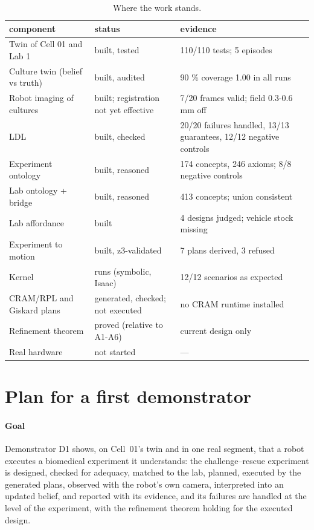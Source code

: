 \documentclass[10.5pt,a4paper]{article}
\begin{document}
\begin{table}[htbp]\centering\footnotesize\caption{Where the work stands.}
\begin{tabularx}{\linewidth}{@{}p{4.6cm}p{4.2cm}X@{}}\toprule component & status & evidence \\\midrule
Twin of Cell 01 and Lab 1 & built, tested & 110/110 tests; 5 episodes \\
Culture twin (belief vs truth) & built, audited & 90 \% coverage 1.00 in all runs \\
Robot imaging of cultures & built; registration not yet effective & 7/20 frames valid; field 0.3-0.6 mm off \\
LDL & built, checked & 20/20 failures handled, 13/13 guarantees, 12/12 negative controls \\
Experiment ontology & built, reasoned & 174 concepts, 246 axioms; 8/8 negative controls \\
Lab ontology + bridge & built, reasoned & 413 concepts; union consistent \\
Lab affordance & built & 4 designs judged; vehicle stock missing \\
Experiment to motion & built, z3-validated & 7 plans derived, 3 refused \\
Kernel & runs (symbolic, Isaac) & 12/12 scenarios as expected \\
CRAM/RPL and Giskard plans & generated, checked; not executed & no CRAM runtime installed \\
Refinement theorem & proved (relative to A1-A6) & current design only \\
Real hardware & not started & --- \\\bottomrule\end{tabularx}\end{table}


\section{Plan for a first demonstrator}\label{sec:plan}
\paragraph{Goal} Demonstrator D1 shows, on Cell~01's twin and in one real segment, that a robot executes a biomedical
experiment it understands: the challenge--rescue experiment is designed, checked for adequacy, matched to the lab,
planned, executed by the generated plans, observed with the robot's own camera, interpreted into an updated belief,
and reported with its evidence, and its failures are handled at the level of the experiment, with the refinement
theorem holding for the executed design.
\end{document}
